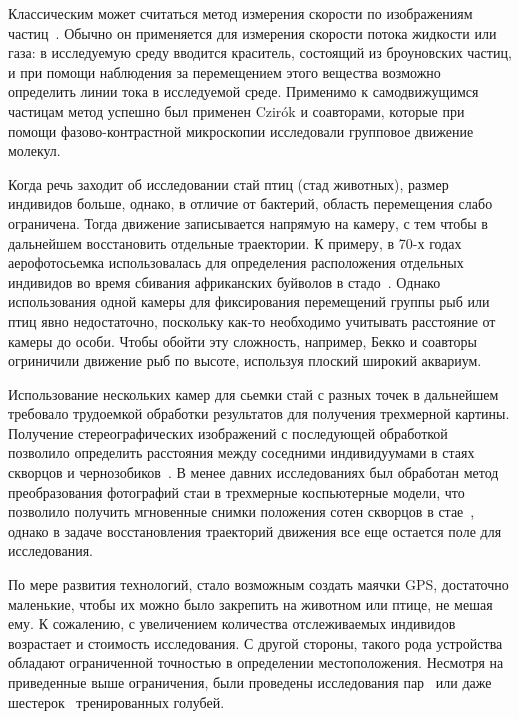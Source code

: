 	Классическим может считаться метод измерения скорости по изображениям частиц~\cite{raffel2007}. Обычно он применяется для измерения скорости потока жидкости или газа: в исследуемую среду вводится краситель, состоящий из броуновских частиц, и при помощи наблюдения за перемещением этого вещества возможно определить линии тока в исследуемой среде. Применимо к самодвижущимся частицам метод успешно был применен  Czir\'{o}k и соавторами\cite{csahok1997}, которые при помощи фазово-контрастной микроскопии исследовали групповое движение молекул.

	Когда речь заходит об исследовании стай птиц (стад животных), размер индивидов больше, однако, в отличие от бактерий, область перемещения слабо ограничена. Тогда движение записывается напрямую на камеру, с тем чтобы в дальнейшем восстановить отдельные траектории. К примеру, в 70-х годах аерофотосьемка использовалась для определения расположения отдельных индивидов во время сбивания африканских буйволов в стадо~\cite{sinclair1977}. Однако использования одной камеры для фиксирования перемещений группы рыб или птиц явно недостаточно, поскольку как-то необходимо учитывать расстояние от камеры до особи. Чтобы обойти эту сложность, например, Бекко и соавторы~\cite{becco2006} огриничили движение рыб по высоте, используя плоский широкий аквариум.

	Использование нескольких камер для сьемки стай с разных точек в дальнейшем требовало трудоемкой обработки результатов для получения трехмерной картины. Получение стереографических изображений с последующей обработкой позволило определить расстояния между соседними индивидуумами в стаях скворцов и чернозобиков~\cite{major1978}. В менее давних исследованиях был обработан метод преобразования фотографий стаи в трехмерные коспьютерные модели, что позволило получить мгновенные снимки положения сотен скворцов в стае~\cite{ballerini2008},  однако в задаче восстановления траекторий движения все еще остается поле для исследования.

	По мере развития технологий, стало возможным создать маячки GPS, достаточно маленькие, чтобы их можно было закрепить на животном или птице, не мешая ему. К сожалению, с увеличением количества отслеживаемых индивидов возрастает и стоимость исследования. С другой стороны, такого рода устройства обладают ограниченной точностью в определении местоположения. Несмотря на приведенные выше ограничения, были проведены исследования пар~\cite{biro2006,nagy2010} или даже шестерок~\cite{dellariccia2008} тренированных голубей.

